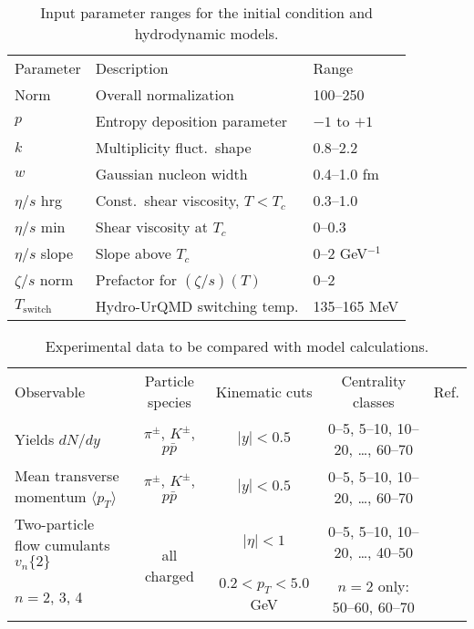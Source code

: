 \documentclass[aps,prc,reprint,amsmath,nofootinbib,superscriptaddress]{revtex4-1}
\newcommand{\avg}[1]{\langle #1 \rangle}
\newcommand{\vnk}[2]{v_#1\{#2\}}
\newcommand{\paddedhline}{\noalign{\smallskip}\hline\noalign{\smallskip}}
\begin{document}
\begin{table}
  \caption{
    \label{tab:design}
    Input parameter ranges for the initial condition and hydrodynamic models.
  }
  \begin{ruledtabular}
  \begin{tabular}{lll}
    Parameter         & Description                        & Range           \\
    \paddedhline
    Norm              & Overall normalization              & 100--250        \\
    $p$               & Entropy deposition parameter       & $-1$ to $+1$    \\
    $k$               & Multiplicity fluct.\ shape         & 0.8--2.2        \\
    $w$               & Gaussian nucleon width             & 0.4--1.0 fm     \\
    $\eta/s$ hrg      & Const.\ shear viscosity, $T < T_c$ & 0.3--1.0        \\
    $\eta/s$ min      & Shear viscosity at $T_c$           & 0--0.3          \\
    $\eta/s$ slope    & Slope above $T_c$                  & 0--2 GeV$^{-1}$ \\
    $\zeta/s$ norm    & Prefactor for $(\zeta/s)(T)$       & 0--2            \\
    $T_\text{switch}$ & Hydro-UrQMD switching temp.        & 135--165 MeV    \\
  \end{tabular}
  \end{ruledtabular}
\end{table}

\begin{table*}
  \caption{
    \label{tab:observables}
    Experimental data to be compared with model calculations.
  }
  \begin{ruledtabular}
  \begin{tabular}{lcccc}
    Observable & Particle species & Kinematic cuts & Centrality classes & Ref. \\
    \paddedhline
    Yields $dN/dy$                       & $\pi^\pm$, $K^\pm$, $p\bar p$ &
    $|y| < 0.5$ & 0--5, 5--10, 10--20, \ldots, 60--70 & \cite{Abelev:2013vea} \\
    \noalign{\smallskip}
    Mean transverse momentum $\avg{p_T}$ & $\pi^\pm$, $K^\pm$, $p\bar p$ &
    $|y| < 0.5$ & 0--5, 5--10, 10--20, \ldots, 60--70 & \cite{Abelev:2013vea} \\
    \noalign{\smallskip}
    Two-particle flow cumulants $\vnk n 2$ & \multirow{2}{*}{all charged} &
    $|\eta| < 1$ & 0--5, 5--10, 10--20, \ldots, 40--50 &
    \multirow{2}{*}{\cite{ALICE:2011ab}} \\
    $n = 2$, 3, 4 & & $0.2 < p_T < 5.0$ GeV & $n = 2$ only: 50--60, 60--70 & \\
  \end{tabular}
  \end{ruledtabular}
\end{table*}
\end{document}
